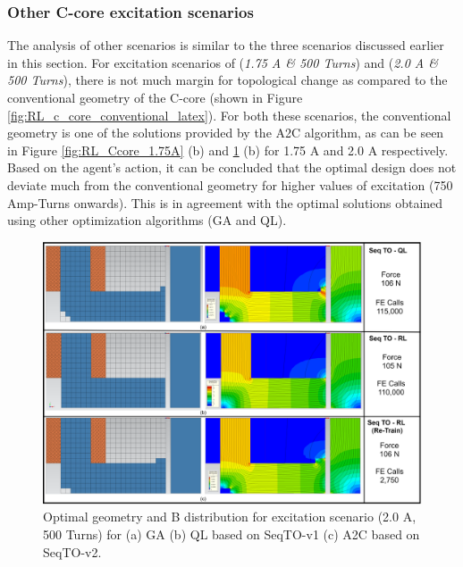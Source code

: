 \subsubsection{Other C-core excitation scenarios}

The analysis of other scenarios is similar to the three scenarios discussed earlier in this section. For excitation scenarios of (\textit{1.75 A \& 500 Turns}) and (\textit{2.0 A \& 500 Turns}), there is not much margin for topological change as compared to the conventional geometry of the C-core (shown in Figure \ref{fig:RL_c_core_conventional_latex}). For both these scenarios, the conventional geometry is one of the solutions provided by the A2C algorithm, as can be seen in Figure \ref{fig:RL_Ccore_1.75A} (b) and \ref{fig:RL_Ccore_2.0A} (b) for 1.75 A and 2.0 A respectively. Based on the agent’s action, it can be concluded that the optimal design does not deviate much from the conventional geometry for higher values of excitation (750 Amp-Turns onwards). This is in agreement with the optimal solutions obtained using other optimization algorithms (GA and QL). 

\begin{figure}[h!]
    \centering
    \includegraphics[width=\textwidth]{Figures/Ch_RL/Ccore_2.0A.png}
    \caption{Optimal geometry and B distribution for excitation scenario (2.0 A, 500 Turns) for (a) GA (b) QL based on SeqTO-v1 (c) A2C based on SeqTO-v2.}
    \label{fig:RL_Ccore_2.0A}
\end{figure}

